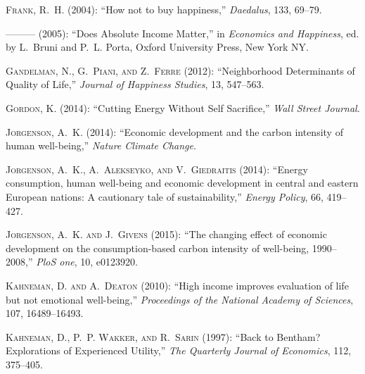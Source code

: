 \documentclass[10pt, letterpaper]{article}
\begin{document}
\begin{spacing}{1.5}
\begin{thebibliography}{52}
\textsc{Frank, R.~H.} (2004): \enquote{How not to buy happiness,}
  \emph{Daedalus}, 133, 69--79.

---\hspace{-.1pt}---\hspace{-.1pt}--- (2005): \enquote{Does Absolute Income
  Matter,} in \emph{Economics and Happiness}, ed. by L.~Bruni and P.~L. Porta,
  Oxford University Press, New York NY.

\textsc{Gandelman, N., G.~Piani, and Z.~Ferre} (2012): \enquote{Neighborhood
  Determinants of Quality of Life,} \emph{Journal of Happiness Studies}, 13,
  547--563.

\textsc{Gordon, K.} (2014): \enquote{Cutting Energy Without Self Sacrifice,}
  \emph{Wall Street Journal}.

\textsc{Jorgenson, A.~K.} (2014): \enquote{Economic development and the carbon
  intensity of human well-being,} \emph{Nature Climate Change}.

\textsc{Jorgenson, A.~K., A.~Alekseyko, and V.~Giedraitis} (2014):
  \enquote{Energy consumption, human well-being and economic development in
  central and eastern European nations: A cautionary tale of sustainability,}
  \emph{Energy Policy}, 66, 419--427.

\textsc{Jorgenson, A.~K. and J.~Givens} (2015): \enquote{The changing effect of
  economic development on the consumption-based carbon intensity of well-being,
  1990--2008,} \emph{PloS one}, 10, e0123920.

\textsc{Kahneman, D. and A.~Deaton} (2010): \enquote{High income improves
  evaluation of life but not emotional well-being,} \emph{Proceedings of the
  National Academy of Sciences}, 107, 16489--16493.

\textsc{Kahneman, D., P.~P. Wakker, and R.~Sarin} (1997): \enquote{Back to
  Bentham? {E}xplorations of Experienced Utility,} \emph{The Quarterly Journal
  of Economics}, 112, 375--405.


\end{thebibliography}
\end{spacing}
\end{document}

